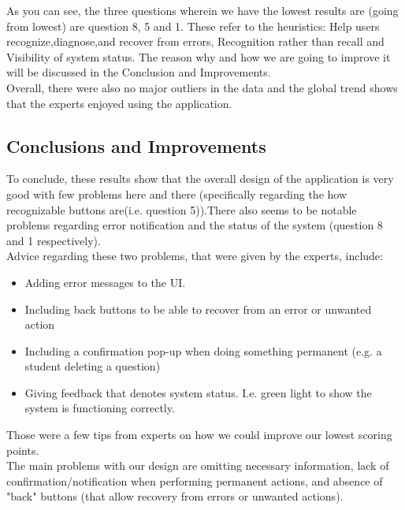\documentclass{article}
\begin{document}
    As you can see, the three questions wherein we have the lowest results are (going from lowest) are question 8, 5 and 1. These refer to the heuristics: Help users recognize,diagnose,and recover from errors, Recognition rather than recall and Visibility of system status.  The reason why and how we are going to improve it will be discussed in the Conclusion and Improvements.\\

    Overall, there were also no major outliers in the data and the global trend shows that the experts enjoyed using the application.


    \subsection{Conclusions and Improvements}
    To conclude, these results show that the overall design of the application is very good with few problems here and there (specifically regarding the how recognizable buttons are(i.e. question 5)).There also seems to be notable problems regarding error notification and the status of the system (question 8 and 1 respectively).\\

    Advice regarding these two problems, that were given by the experts, include: \begin{itemize}
                                                                                      \item Adding error messages to the UI.
                                                                                      \item Including back buttons to be able to recover from an error or unwanted action
                                                                                      \item Including a confirmation pop-up when doing something permanent (e.g. a student deleting a question)
                                                                                      \item Giving feedback that denotes system status. I.e. green light to show the system is functioning correctly.
    \end{itemize}

    Those were a few tips from experts on how we could improve our lowest scoring points.\\

    The main problems with our design are omitting necessary information, lack of confirmation/notification when performing permanent actions, and absence of "back" buttons (that allow recovery from errors or unwanted actions).\\
\end{document}
